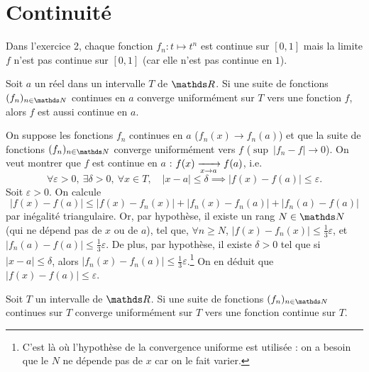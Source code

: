 \section{Continuité}

\begin{exm}
	Dans l'exercice 2, chaque fonction $f_n : t \mapsto t^n$\/ est continue sur $[0,1]$\/ mais la limite $f$\/ n'est pas continue sur $[0,1]$\/ (car elle n'est pas continue en $1$).
\end{exm}

\begin{thm}
	Soit $a$\/ un réel dans un intervalle $T$\/ de $\R$. Si une suite de fonctions $(f_n)_{n\in\N}$\/ continues en $a$\/ converge uniformément sur $T$\/ vers une fonction $f$, alors $f$\/ est aussi continue en $a$.
\end{thm}

\begin{prv}
	On suppose les fonctions $f_n$\/ continues en $a$\/ ($f_n(x) \longrightarrow f_n(a)$) et que la suite de fonctions $(f_n)_{n\in\N}$\/ converge uniformément vers $f$\/ ($\sup\:|f_n -f| \longrightarrow 0$). On veut montrer que $f$\/ est continue en $a$\/ : $f(x) \xrightarrow[x \to a]{} f(a)$, i.e.\ \[
		\forall \varepsilon > 0,\:\exists \delta > 0,\: \forall x \in T,\quad|x-a| \le \delta \implies |f(x) - f(a)| \le \varepsilon
	.\]
	Soit $\varepsilon > 0$. On calcule \[
		\big|f(x) - f(a)\big| \le \big|f(x) - f_n(x)\big| + \big|f_n(x) - f_n(a)\big| + \big|f_n(a) - f(a)\big|
	\] par inégalité triangulaire. Or, par hypothèse, il existe un rang $N \in \N$\/ (qui ne dépend pas de $x$\/ ou de $a$), tel que, $\forall n \ge N$, $\big|f(x) - f_n(x)\big| \le \frac{1}{3} \varepsilon$, et $\big|f_n(a) - f(a)\big| \le \frac{1}{3} \varepsilon$.
	De plus, par hypothèse, il existe $\delta >0$\/ tel que si $|x - a| \le \delta$, alors $|f_n(x) - f_n(a)| \le \frac{1}{3}\varepsilon$.\footnote{C'est là où l'hypothèse de la convergence uniforme est utilisée : on a besoin que le $N$\/ ne dépende pas de $x$\/ car on le fait varier.}
	On en déduit que $\big|f(x) - f(a)\big| \le \varepsilon$.
\end{prv}

\begin{crlr}
	Soit $T$\/ un intervalle de $\R$. Si une suite de fonctions $(f_n)_{n\in\N}$\/ continues sur $T$\/ converge uniformément sur $T$\/ vers une fonction continue sur $T$.
\end{crlr}

